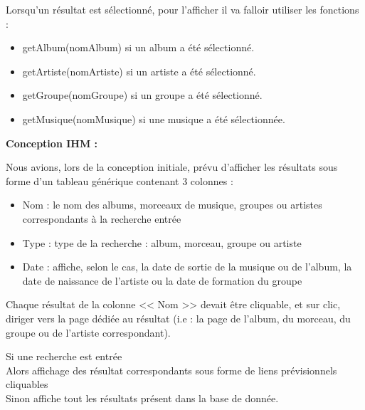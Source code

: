             \begin{paragraphe}
                 Lorsqu'un résultat est sélectionné, pour l'afficher il va falloir utiliser les fonctions :
                \begin{itemize}
                    \item getAlbum(nomAlbum) si un album a été sélectionné.
                    \item getArtiste(nomArtiste) si un artiste a été sélectionné.
                    \item getGroupe(nomGroupe) si un groupe a été sélectionné.
                    \item getMusique(nomMusique) si une musique a été sélectionnée.
                \end{itemize}
            \end{paragraphe}

			\begin{paragraphe}
				\textbf{Conception IHM :}
			\end{paragraphe}

			\begin{paragraphe}
			    Nous avions, lors de la conception initiale, prévu d'afficher les résultats sous forme d'un tableau générique contenant 3 colonnes :
				\begin{itemize}
					\item Nom : le nom des albums, morceaux de musique, groupes ou artistes correspondants à la recherche entrée
					\item Type : type de la recherche : album, morceau, groupe ou artiste
					\item Date : affiche, selon le cas, la date de sortie de la musique ou de l'album, la date de naissance de l'artiste ou la date de formation du groupe
				\end{itemize}
				Chaque résultat de la colonne << Nom >> devait être cliquable, et sur clic, diriger vers la page dédiée au résultat (i.e : la page de l'album, du morceau, du groupe ou de l'artiste correspondant).
			\end{paragraphe}

            \begin{paragraphe}
                Si une recherche est entrée\\
                Alors affichage des résultat correspondants sous forme de liens prévisionnels cliquables\\
                Sinon affiche tout les résultats présent dans la base de donnée.
            \end{paragraphe}

